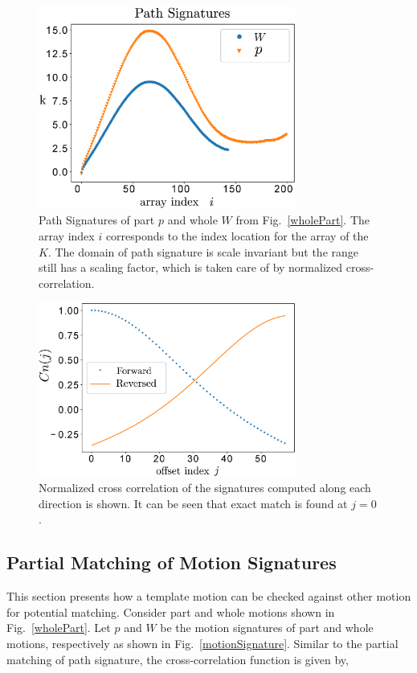 \documentclass[twocolumn,10pt]{asme2ej}
\begin{document}
\begin{figure}
\centering
\includegraphics[width=240pt]{figure/fig_path_signatures.eps}
  \caption{Path Signatures of part $p$ and whole $W$ from Fig.~\ref{wholePart}. The array index $i$ corresponds to the index location for the array of the $K$. The domain of path signature is scale invariant but the range still has a scaling factor, which is taken care of by normalized cross-correlation.}
\label{pathSignature}
\end{figure}

\begin{figure}
\centering
\includegraphics[width=240pt]{figure/fig_ncc.eps}
  \caption{Normalized cross correlation of the signatures computed along each direction is shown. It can be seen that exact match is found at $j=0$.}
\label{ncc}
\end{figure}

\subsection{Partial Matching of Motion Signatures}\label{sec_mcc}
This section presents how a template motion can be checked against other motion for potential matching.
Consider part and whole motions shown in Fig.~\ref{wholePart}.
Let $p$ and $W$ be the motion signatures of part and whole motions, respectively as shown in Fig.~\ref{motionSignature}.
Similar to the partial matching of path signature, the cross-correlation function is given by,
\end{document}
